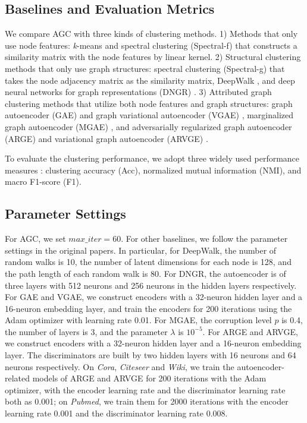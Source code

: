 \documentclass{article}
\begin{document}
\subsection{Baselines and Evaluation Metrics}
We compare AGC with three kinds of clustering methods. 1) Methods that only use node features: \emph{k}-means and spectral clustering (Spectral-f) that constructs a similarity matrix with the node features by linear kernel. 2) Structural clustering methods that only use graph structures: spectral clustering (Spectral-g) that takes the node adjacency matrix as the similarity matrix, DeepWalk \cite{perozzi2014deepwalk}, and deep neural networks for graph representations (DNGR) \cite{cao2016deep}. 3) Attributed graph clustering methods that utilize both node features and graph structures: graph autoencoder (GAE) and graph variational autoencoder (VGAE) \cite{kipf2016variational}, marginalized graph autoencoder (MGAE) \cite{wang2017mgae}, and adversarially regularized graph autoencoder (ARGE) and variational graph autoencoder (ARVGE) \cite{pan2018adversarially}.

To evaluate the clustering performance, we adopt three widely used performance measures \cite{Aggarwal14}: clustering accuracy (Acc), normalized mutual information (NMI), and macro F1-score (F1).



\subsection{Parameter Settings}
For AGC, we set $max\_iter=60$. For other baselines, we follow the parameter settings in the original papers. In particular, for DeepWalk, the number of random walks is 10, the number of latent dimensions for each node is 128, and the path length of each random walk is 80. For DNGR, the autoencoder is of three layers with 512 neurons and 256 neurons in the hidden layers respectively. For GAE and VGAE, we construct encoders with a 32-neuron hidden layer and a 16-neuron embedding layer, and train the encoders for 200 iterations using the Adam optimizer with learning rate 0.01.
For MGAE, the corruption level $p$ is 0.4, the number of layers is 3, and the parameter $\lambda$ is $10^{-5}$. For ARGE and ARVGE, we construct encoders with a 32-neuron hidden layer and a 16-neuron embedding layer. The discriminators are built by two hidden layers with 16 neurons and 64 neurons respectively. On \emph{Cora}, \emph{Citeseer} and \emph{Wiki}, we train the autoencoder-related models of ARGE and ARVGE for 200 iterations with the Adam optimizer, with the encoder learning rate and the discriminator learning rate both as 0.001; on \emph{Pubmed}, we train them for 2000 iterations with the encoder learning rate 0.001 and the discriminator learning rate 0.008.
\end{document}
